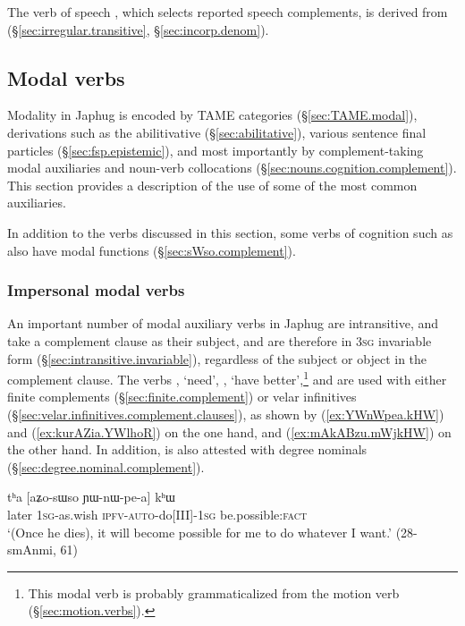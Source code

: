 The verb of speech , which selects reported speech complements, is derived from  (§\ref{sec:irregular.transitive}, §\ref{sec:incorp.denom}).

 \subsection{Modal verbs}
Modality in Japhug is encoded by TAME categories (§\ref{sec:TAME.modal}), derivations such as the abilitivative (§\ref{sec:abilitative}), various sentence final particles (§\ref{sec:fsp.epistemic}), and most importantly by complement-taking modal auxiliaries and noun-verb collocations (§\ref{sec:nouns.cognition.complement}). This section provides a description of the use of some of the most common auxiliaries. 
  
In addition to the verbs discussed in this section, some verbs of cognition such as   also have modal functions (§\ref{sec:sWso.complement}).


 \subsubsection{Impersonal modal verbs} \label{sec:ra.khW.jAG.verb}
An important number of modal auxiliary verbs in Japhug are intransitive, and take a complement clause as their subject, and are therefore in \textsc{3sg} invariable form (§\ref{sec:intransitive.invariable}), regardless of the subject or object in the complement clause. The verbs , `need', , `have better',\footnote{This modal verb is probably grammaticalized from the motion verb (§\ref{sec:motion.verbs}).} and  are used with either finite complements (§\ref{sec:finite.complement}) or velar infinitives (§\ref{sec:velar.infinitives.complement.clauses}), as shown by (\ref{ex:YWnWpea.kHW}) and (\ref{ex:kurAZia.YWlhoR}) on the one hand, and (\ref{ex:mAkABzu.mWjkHW}) on the other hand. In addition,  is also attested with degree nominals (§\ref{sec:degree.nominal.complement}).

\begin{exe} 
\ex \label{ex:YWnWpea.kHW}
\gll tʰa [aʑo-sɯso ɲɯ-nɯ-pe-a] kʰɯ \\
later \textsc{1sg}-as.wish \textsc{ipfv}-\textsc{auto}-do[III]-\textsc{1sg} be.possible:\textsc{fact} \\
\glt `(Once he dies), it will become possible for me to do whatever I want.' (28-smAnmi, 61)
\end{exe} 


